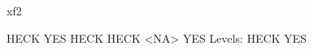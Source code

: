 \begin{Schunk}
\begin{Sinput}
   xf2
\end{Sinput}
\begin{Soutput}
[1] HECK YES  HECK HECK <NA> YES 
Levels: HECK YES
\end{Soutput}
\end{Schunk}
